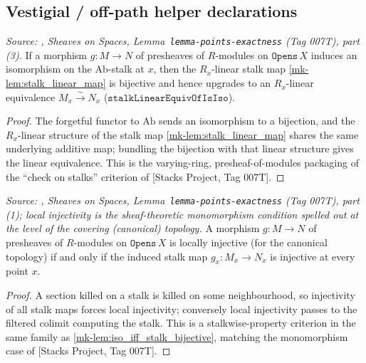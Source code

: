 \subsection{Vestigial / off-path helper declarations}
\label{mk-subsec:tensorobj_vestigial_helpers}


\begin{lemma}
  \label{mk-lem:iso_iff_stalk_bijective}

  \textit{Source: \cite{stacks-project}, Sheaves on Spaces, Lemma~\texttt{lemma-points-exactness}
  (Tag 007T), part (3).}
  If a morphism \(g\colon M \to N\) of presheaves of \(R\)-modules on
  \(\mathtt{Opens}\,X\) induces an isomorphism on the \(\mathrm{Ab}\)-stalk at \(x\),
  then the \(R_x\)-linear stalk map \ref{mk-lem:stalk_linear_map} is bijective and hence
  upgrades to an \(R_x\)-linear equivalence \(M_x \xrightarrow{\sim} N_x\)
  (\(\mathtt{stalkLinearEquivOfIsIso}\)).
\end{lemma}
\begin{proof}
 The forgetful functor to \(\mathrm{Ab}\) sends an isomorphism
  to a bijection, and the \(R_x\)-linear structure of the stalk map
  \ref{mk-lem:stalk_linear_map} shares the same underlying additive map; bundling the
  bijection with that linear structure gives the linear equivalence. This is the
  varying-ring, presheaf-of-modules packaging of the ``check on stalks'' criterion of
  [Stacks Project, Tag 007T].
\end{proof}

\begin{lemma}
  \label{mk-lem:locally_injective_iff_stalk}

  \textit{Source: \cite{stacks-project}, Sheaves on Spaces, Lemma~\texttt{lemma-points-exactness}
  (Tag 007T), part (1); local injectivity is the sheaf-theoretic monomorphism condition
  spelled out at the level of the covering (canonical) topology.}
  A morphism \(g\colon M \to N\) of presheaves of \(R\)-modules on \(\mathtt{Opens}\,X\)
  is locally injective (for the canonical topology) if and only if the induced stalk map
  \(g_x\colon M_x \to N_x\) is injective at every point \(x\).
\end{lemma}
\begin{proof}
 A section killed on a stalk is killed on some neighbourhood,
  so injectivity of all stalk maps forces local injectivity; conversely local
  injectivity passes to the filtered colimit computing the stalk. This is a
  stalkwise-property criterion in the same family as \ref{mk-lem:iso_iff_stalk_bijective},
  matching the monomorphism case of [Stacks Project, Tag 007T].
\end{proof}

